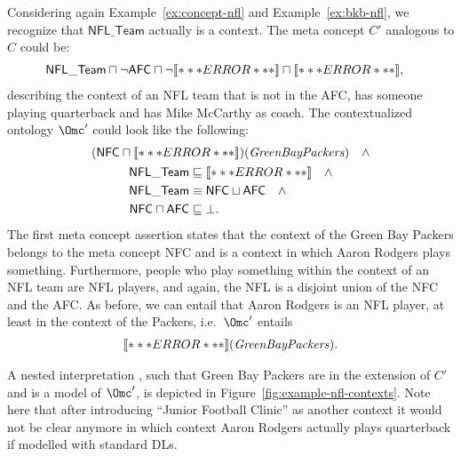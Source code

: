 \begin{example}
  Considering again Example~\ref{ex:concept-nfl} and Example~\ref{ex:bkb-nfl}, we recognize that
  $\mathsf{NFL\_Team}$ actually is a context. The meta concept $C'$ analogous to $C$ could be:
  \begin{align*}
    & \mathsf{NFL\_{}Team} \sqcap \lnot \mathsf{AFC} \sqcap
    \lnot\oax{\exists\plays.\mathsf{Quarterback}\sqsubseteq\bot} 
    \sqcap \oax{\mathsf{Coach}(\text{\textit{MikeMcCarthy}})},
  \end{align*}
  describing the context of an NFL team that is not in the AFC, has someone playing quarterback and
  has Mike McCarthy as coach.  The contextualized ontology $\Omc'$ could look like the following:
  \begin{gather*}
    (\mathsf{NFC} \sqcap
    \oax{(\exists\plays.\top)(\text{\textit{AaronRodgers}})})(\text{\textit{GreenBayPackers}})
    \quad\land\\ 
    \begin{aligned}
      \mathsf{NFL\_Team} & \sqsubseteq \oax{\exists\plays.\top \sqsubseteq
        \mathsf{NFL\_Player}}\quad\land\\ 
      \mathsf{NFL\_Team} & \equiv \mathsf{NFC} \sqcup \mathsf{AFC}\quad\land\\
      \mathsf{NFC} \sqcap \mathsf{AFC} & \sqsubseteq \bot.
    \end{aligned}
  \end{gather*}
  The first meta concept assertion states that the context of the Green Bay Packers belongs to the
  meta concept NFC and is a context in which Aaron Rodgers plays something. Furthermore, people who
  play something within the context of an NFL team are NFL players, and again, the NFL is a disjoint
  union of the NFC and the AFC. As before, we can entail that Aaron Rodgers is an NFL player, at
  least in the context of the Packers, i.e.\ $\Omc'$ entails
  \begin{gather*}
    \oax{\mathsf{NFL\_Player}(\text{\textit{AaronRodgers}})}(\text{\textit{GreenBayPackers}}).
  \end{gather*}

  A nested interpretation \J, such that Green Bay Packers are in the extension of $C'$ and \J is a
  model of $\Omc'$, is depicted in Figure~\ref{fig:example-nfl-contexts}. Note here that after
  introducing ``Junior Football Clinic'' as another context it would not be clear anymore in which
  context Aaron Rodgers actually plays quarterback if modelled with standard DLs.
\end{example}

